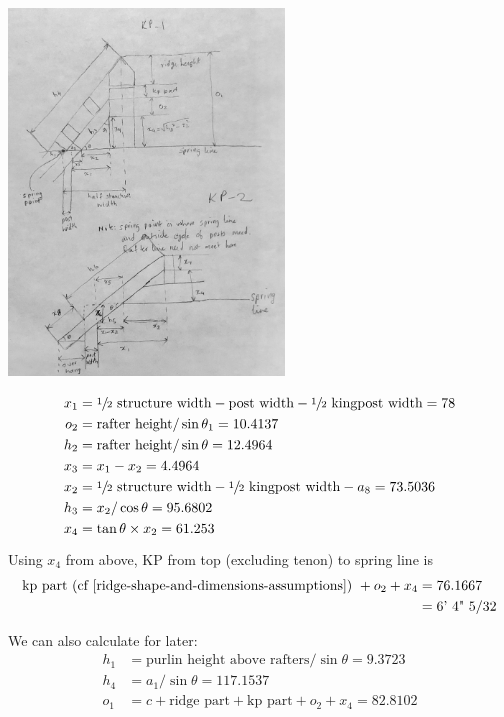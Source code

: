 \documentclass{article}\usepackage[]{graphicx}\usepackage[]{xcolor}
\begin{document}
\begin{center}
	\includegraphics[width=0.55\textwidth]{images/kingpost_and_collar_tie_lengths}
\end{center}

\begin{align*}
x_1 &= \sfrac{1}{2} \text{ structure width} - \text{post width} - \sfrac{1}{2} \text{ kingpost width} = 78\\
o_2 &= \text{rafter height}/\sin\theta_1 = 10.4137\\
h_2 &= \text{rafter height}/\sin\theta = 12.4964\\
x_3 &= x_1 - x_2 = 4.4964\\
x_2 &= \sfrac{1}{2} \text{ structure width} - \sfrac{1}{2}\text{ kingpost width} - a_8 = 73.5036\\
h_3 &= x_2/\cos\theta = 95.6802\\
x_4 &= \tan\theta \times x_2  = 61.253
\end{align*}

Using $x_4$ from above, KP from top (excluding tenon) to spring line is 
\begin{align*}
\text{kp part (cf \Cref{ridge-shape-and-dimensions-assumptions}) } + o_2 + x_4 &= 76.1667\\
& = \text{6' 4" 5/32}
\end{align*}

We can also calculate for later:
\begin{align*}
h_1 &= \text{purlin height above rafters}/\sin\theta = 9.3723\\
h_4 &= a_1/\sin\theta  = 117.1537\\
o_1 &=  c + \text{ridge part} + \text{kp part} + o_2 + x_4 = 82.8102
\end{align*}
\end{document}
